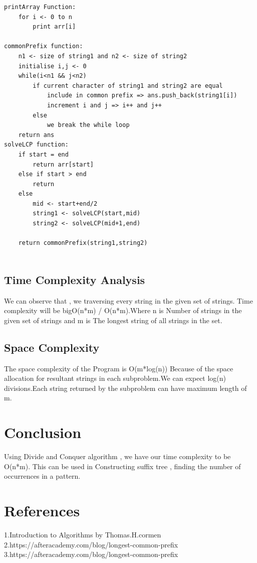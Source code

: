 \documentclass{article}
\begin{document}
\begin{multicols}{2}
\begin{lstlisting}
printArray Function:
    for i <- 0 to n
        print arr[i]

commonPrefix function:
    n1 <- size of string1 and n2 <- size of string2
    initialise i,j <- 0
    while(i<n1 && j<n2)
        if current character of string1 and string2 are equal
            include in common prefix => ans.push_back(string1[i])
            increment i and j => i++ and j++
        else 
            we break the while loop
    return ans
solveLCP function:
    if start = end 
        return arr[start]
    else if start > end
        return
    else 
        mid <- start+end/2
        string1 <- solveLCP(start,mid)
        string2 <- solveLCP(mid+1,end)
        
    return commonPrefix(string1,string2)
        
\end{lstlisting}

\subsection{Time Complexity Analysis}

We can observe that , we traversing every string in the given set of strings. Time complexity will be bigO(n*m) / O(n*m).Where n is Number of strings in the given set of strings and m is The longest string of all strings in the set.

\subsection{Space Complexity}

The space complexity of the Program is O(m*log(n)) Because of the space allocation for resultant strings in each subproblem.We can expect log(n) divisions.Each string returned by the subproblem can have maximum length of m.


\section{Conclusion}
Using Divide and Conquer algorithm , we have our time complexity to be O(n*m).\newline
This can be used in Constructing suffix tree , finding the number of occurrences in a pattern.

\section{References}
1.Introduction to Algorithms by Thomas.H.cormen\newline
2.https://afteracademy.com/blog/longest-common-prefix\newline
3.https://afteracademy.com/blog/longest-common-prefix \newline

\end{multicols}
\end{document}
